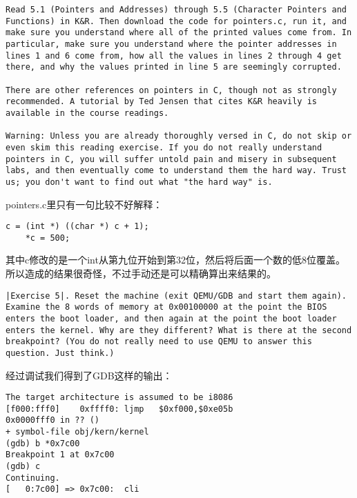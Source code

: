 \documentclass{article}
\begin{document}
\begin{CJK*}{UTF8}{gkai}
\begin{lstlisting}[style=exercise]
Read 5.1 (Pointers and Addresses) through 5.5 (Character Pointers and Functions) in K&R. Then download the code for pointers.c, run it, and make sure you understand where all of the printed values come from. In particular, make sure you understand where the pointer addresses in lines 1 and 6 come from, how all the values in lines 2 through 4 get there, and why the values printed in line 5 are seemingly corrupted.

There are other references on pointers in C, though not as strongly recommended. A tutorial by Ted Jensen that cites K&R heavily is available in the course readings.

Warning: Unless you are already thoroughly versed in C, do not skip or even skim this reading exercise. If you do not really understand pointers in C, you will suffer untold pain and misery in subsequent labs, and then eventually come to understand them the hard way. Trust us; you don't want to find out what "the hard way" is.
\end{lstlisting}

pointers.c里只有一句比较不好解释：

\begin{lstlisting}[style=ccode, numbers=none]
    c = (int *) ((char *) c + 1);
    *c = 500;
\end{lstlisting}

其中c修改的是一个int从第九位开始到第32位，然后将后面一个数的低8位覆盖。所以造成的结果很奇怪，不过手动还是可以精确算出来结果的。

\vspace{3em}

\begin{lstlisting}[style=exercise]
|Exercise 5|. Reset the machine (exit QEMU/GDB and start them again). Examine the 8 words of memory at 0x00100000 at the point the BIOS enters the boot loader, and then again at the point the boot loader enters the kernel. Why are they different? What is there at the second breakpoint? (You do not really need to use QEMU to answer this question. Just think.)
\end{lstlisting}

经过调试我们得到了GDB这样的输出：

\begin{lstlisting}[style=console]
The target architecture is assumed to be i8086
[f000:fff0]    0xffff0:	ljmp   $0xf000,$0xe05b
0x0000fff0 in ?? ()
+ symbol-file obj/kern/kernel
(gdb) b *0x7c00
Breakpoint 1 at 0x7c00
(gdb) c
Continuing.
[   0:7c00] => 0x7c00:	cli    


\end{lstlisting}
\end{CJK*}
\end{document}
